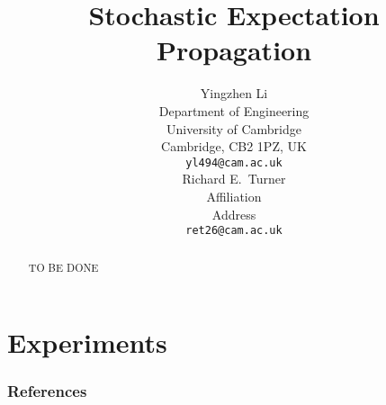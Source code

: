 \documentclass{article} %
\title{Stochastic Expectation Propagation}
\author{
Yingzhen Li \\
Department of Engineering\\
University of Cambridge\\
Cambridge, CB2 1PZ, UK \\
\texttt{yl494@cam.ac.uk} \\
\And
Richard E.~Turner \\
Affiliation \\
Address \\
\texttt{ret26@cam.ac.uk} \\
}
\begin{document}
\maketitle

\begin{abstract}
TO BE DONE
\end{abstract}










\section{Experiments}






\subsubsection*{References}
\renewcommand{\section}[2]{}


\end{document}
